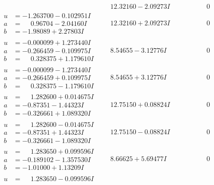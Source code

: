 \documentclass[1p]{elsarticle_modified}
\theoremstyle{definition}
\begin{document}
$$\begin{array}{c|c|c}
 & \phantom{-}12.32160 - 2.09273 I & \phantom{-0.000000 } 0 \\ \hline\begin{aligned}
u &= -1.263700 - 0.102951 I \\
a &= \phantom{-}0.96704 - 2.04160 I \\
b &= -1.98089 + 2.27803 I\end{aligned}
 & \phantom{-}12.32160 + 2.09273 I & \phantom{-0.000000 } 0 \\ \hline\begin{aligned}
u &= -0.000099 + 1.273440 I \\
a &= -0.266459 - 0.109975 I \\
b &= \phantom{-}0.328375 + 1.179610 I\end{aligned}
 & \phantom{-}8.54655 - 3.12776 I & \phantom{-0.000000 } 0 \\ \hline\begin{aligned}
u &= -0.000099 - 1.273440 I \\
a &= -0.266459 + 0.109975 I \\
b &= \phantom{-}0.328375 - 1.179610 I\end{aligned}
 & \phantom{-}8.54655 + 3.12776 I & \phantom{-0.000000 } 0 \\ \hline\begin{aligned}
u &= \phantom{-}1.282600 + 0.014675 I \\
a &= -0.87351 - 1.44323 I \\
b &= -0.326661 + 1.089320 I\end{aligned}
 & \phantom{-}12.75150 + 0.08824 I & \phantom{-0.000000 } 0 \\ \hline\begin{aligned}
u &= \phantom{-}1.282600 - 0.014675 I \\
a &= -0.87351 + 1.44323 I \\
b &= -0.326661 - 1.089320 I\end{aligned}
 & \phantom{-}12.75150 - 0.08824 I & \phantom{-0.000000 } 0 \\ \hline\begin{aligned}
u &= \phantom{-}1.283650 + 0.099596 I \\
a &= -0.189102 - 1.357530 I \\
b &= -1.01000 + 1.13209 I\end{aligned}
 & \phantom{-}8.66625 + 5.69477 I & \phantom{-0.000000 } 0 \\ \hline\begin{aligned}
u &= \phantom{-}1.283650 - 0.099596 I \\

\end{aligned}
\end{array}$$
\end{document}
